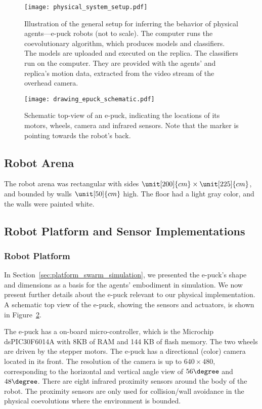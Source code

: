 \begin{figure}[!t]
    \centering
    \texttt{[image: physical\_system\_setup.pdf]}
    \caption{Illustration of the general setup for inferring the behavior of physical agents---e-puck robots (not to scale). The computer runs the coevolutionary algorithm, which produces models and classifiers. The models are uploaded and executed on the replica. The classifiers run on the computer. They are provided with the agents' and replica's motion data, extracted from the video stream of the overhead camera.}
    \label{fig:physical_system_setup}
\end{figure} 

\begin{figure}[!t]
	\centering
	\texttt{[image: drawing\_epuck\_schematic.pdf]}
	\caption{Schematic top-view of an e-puck, indicating the locations of its motors, wheels, camera and infrared sensors. Note that the marker is pointing towards the robot's back.}
	\label{fig:e_puck_schematic}
\end{figure}

\subsection{Robot Arena}\label{sec:robot_arena_physical_swarm}

The robot arena was rectangular with sides $\unit[200]{cm} \times \unit[225]{cm}$, and bounded by walls $\unit[50]{cm}$ high. The floor had a light gray color, and the walls were painted white.

\subsection{Robot Platform and Sensor Implementations}\label{sec:robot_platform_sensor_implementation}

\subsubsection{Robot Platform}

In Section~\ref{sec:platform_swarm_simulation}, we presented the e-puck's shape and dimensions as a basis for the agents' embodiment in simulation. We now present further details about the e-puck relevant to our physical implementation. A schematic top view of the e-puck, showing the sensors and actuators, is shown in Figure~\ref{fig:e_puck_schematic}.

The e-puck has a on-board micro-controller, which is the Microchip dsPIC30F6014A with 8KB of RAM and 144 KB of flash memory. The two wheels are driven by the stepper motors. The e-puck has a directional (color) camera located in its front. The resolution of the camera is up to $640\times480$, corresponding to the horizontal and vertical angle view of $56\degree$ and $48\degree$. There are eight infrared proximity sensors around the body of the robot. The proximity sensors are only used for collision/wall avoidance in the physical coevolutions where the environment is bounded. 

